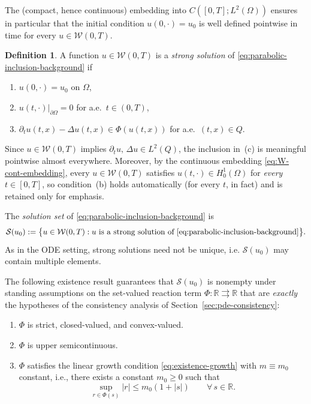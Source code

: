 \documentclass[11pt]{elsarticle}
\theoremstyle{definition}
\newtheorem{definition}[theorem]{Definition}
\theoremstyle{remark}
\numberwithin{equation}{section}
\begin{document}
The (compact, hence continuous) embedding into $C([0,T];L^2(\Omega))$
ensures in particular that the initial condition $u(0,\cdot)=u_0$ is well
defined pointwise in time for every $u\in\mathcal{W}(0,T)$.

\begin{definition}\label{def:strong-solution-pde}
	A function $u\in\mathcal{W}(0,T)$ is a \emph{strong solution} of
	\eqref{eq:parabolic-inclusion-background} if
	\begin{enumerate}
		\item[\rm(a)] $u(0,\cdot)=u_0$ on $\Omega$,
		\item[\rm(b)] $u(t,\cdot)|_{\partial\Omega}=0$ for a.e.\ $t\in(0,T)$,
		\item[\rm(c)] $\partial_t u(t,x)-\Delta u(t,x)\in\Phi(u(t,x))$ for
		a.e.\ $(t,x)\in Q$.
	\end{enumerate}
	Since $u\in\mathcal{W}(0,T)$ implies $\partial_t u,\,\Delta u\in L^2(Q)$,
	the inclusion in~(c) is meaningful pointwise almost everywhere.
	Moreover, by the continuous embedding \eqref{eq:W-cont-embedding},
	every $u\in\mathcal{W}(0,T)$ satisfies $u(t,\cdot)\in H_0^1(\Omega)$
	for \emph{every} $t\in[0,T]$, so condition~(b) holds automatically
	(for every $t$, in fact) and is retained only for emphasis.
\end{definition}

The \emph{solution set} of \eqref{eq:parabolic-inclusion-background} is
\begin{equation}\label{eq:solution-PDI}
	\mathcal{S}(u_0)
	:=
	\bigl\{u\in\mathcal{W}(0,T):u\text{ is a strong solution of }
	\eqref{eq:parabolic-inclusion-background}\bigr\}.
\end{equation}
As in the ODE setting, strong solutions need not be unique, i.e. $\mathcal{S}(u_0)$
may contain multiple elements.

The following existence result guarantees that $\mathcal{S}(u_0)$ is
nonempty under standing assumptions on the set-valued reaction term
$\Phi:\mathbb{R}\rightrightarrows\mathbb{R}$ that are \emph{exactly} the
hypotheses of the consistency analysis of
Section~\ref{sec:pde-consistency}:

\begin{enumerate}[label=(P\arabic*)]
	\item \label{P1} $\Phi$ is strict, closed-valued, and convex-valued.
	
	\item \label{P2} $\Phi$ is upper semicontinuous.
	
	\item \label{P3} $\Phi$ satisfies the linear growth condition 
	\eqref{eq:existence-growth} with $m\equiv m_0$ constant, i.e.,
	there exists a constant $m_0\ge 0$ such that
	\[
	\sup_{r\in\Phi(s)}|r|\le m_0(1+|s|)
	\qquad\forall\, s\in\mathbb{R}.
	\]
\end{enumerate}
\end{document}
